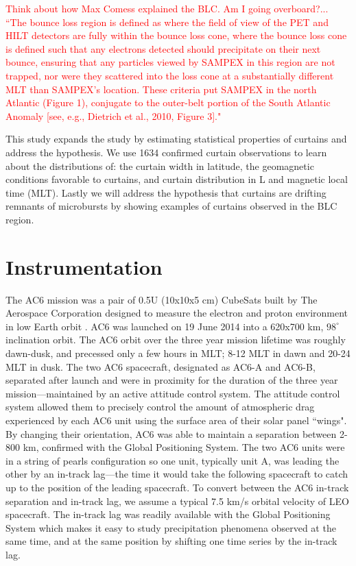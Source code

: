 \documentclass[draft]{agujournal2019}
\begin{document}
\textcolor{red}{Think about how Max Comess explained the BLC. Am I going overboard?... ``The bounce loss region is defined as
where the field of view of the PET and HILT detectors are
fully within the bounce loss cone, where the bounce loss cone
is defined such that any electrons detected should precipitate
on their next bounce, ensuring that any particles viewed by
SAMPEX in this region are not trapped, nor were they
scattered into the loss cone at a substantially different MLT
than SAMPEX’s location. These criteria put SAMPEX in
the north Atlantic (Figure 1), conjugate to the outer-belt
portion of the South Atlantic Anomaly [see, e.g., Dietrich
et al., 2010, Figure 3]."}

This study expands the  study by estimating statistical properties of curtains and address the  hypothesis. We use 1634 confirmed curtain observations to learn about the distributions of: the curtain width in latitude, the geomagnetic conditions favorable to curtains, and curtain distribution in L and magnetic local time (MLT). Lastly we will address the hypothesis that curtains are drifting remnants of microbursts by showing examples of curtains observed in the BLC region.

\section{Instrumentation} \label{instrumentation}
The AC6 mission was a pair of 0.5U (10x10x5 cm) CubeSats built by The Aerospace Corporation designed to measure the electron and proton environment in low Earth orbit \cite{O'brien2016}. AC6 was launched on 19 June 2014 into a 620x700 km, $98^\circ$ inclination orbit. The AC6 orbit over the three year mission lifetime was roughly dawn-dusk, and precessed only a few hours in MLT; 8-12 MLT in dawn and 20-24 MLT in dusk. The two AC6 spacecraft, designated as AC6-A and AC6-B, separated after launch and were in proximity for the duration of the three year mission---maintained by an active attitude control system. The attitude control system allowed them to precisely control the amount of atmospheric drag experienced by each AC6 unit using the surface area of their solar panel ``wings". By changing their orientation, AC6 was able to maintain a separation between 2-800 km, confirmed with the Global Positioning System. The two AC6 units were in a string of pearls configuration so one unit, typically unit A, was leading the other by an in-track lag---the time it would take the following spacecraft to catch up to the position of the leading spacecraft. To convert between the AC6 in-track separation and in-track lag, we assume a typical 7.5 km/s orbital velocity of LEO spacecraft. The in-track lag was readily available with the Global Positioning System which makes it easy to study precipitation phenomena observed at the same time, and at the same position by shifting one time series by the in-track lag.
\end{document}
